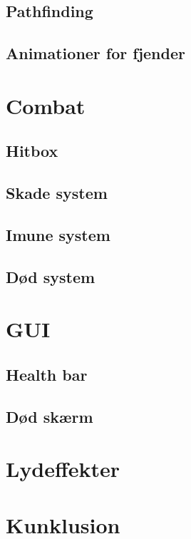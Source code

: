 \documentclass{article}
\begin{document}
    \subsection{Pathfinding}
    \subsection{Animationer for fjender}

\section{Combat}
    \subsection{Hitbox}
    \subsection{Skade system}
    \subsection{Imune system}
    \subsection{Død system}

\section{GUI}
    \subsection{Health bar}
    \subsection{Død skærm}

\section{Lydeffekter}

\section{Kunklusion}
\end{document}
